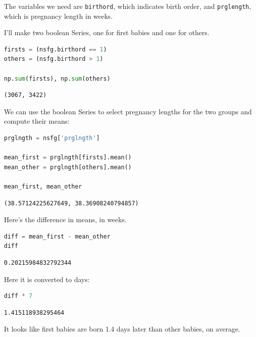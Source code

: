The variables we need are \passthrough{\lstinline!birthord!}, which
indicates birth order, and \passthrough{\lstinline!prglength!}, which is
pregnancy length in weeks.

I'll make two boolean Series, one for first babies and one for others.

\begin{lstlisting}[language=Python,style=source]
firsts = (nsfg.birthord == 1)
others = (nsfg.birthord > 1)

np.sum(firsts), np.sum(others)
\end{lstlisting}

\begin{lstlisting}[style=output]
(3067, 3422)
\end{lstlisting}

We can use the boolean Series to select pregnancy lengths for the two
groups and compute their means:

\begin{lstlisting}[language=Python,style=source]
prglngth = nsfg['prglngth']

mean_first = prglngth[firsts].mean() 
mean_other = prglngth[others].mean()

mean_first, mean_other
\end{lstlisting}

\begin{lstlisting}[style=output]
(38.57124225627649, 38.36908240794857)
\end{lstlisting}

Here's the difference in means, in weeks.

\begin{lstlisting}[language=Python,style=source]
diff = mean_first - mean_other
diff
\end{lstlisting}

\begin{lstlisting}[style=output]
0.20215984832792344
\end{lstlisting}

Here it is converted to days:

\begin{lstlisting}[language=Python,style=source]
diff * 7
\end{lstlisting}

\begin{lstlisting}[style=output]
1.415118938295464
\end{lstlisting}

It looks like first babies are born 1.4 days later than other babies, on
average.

